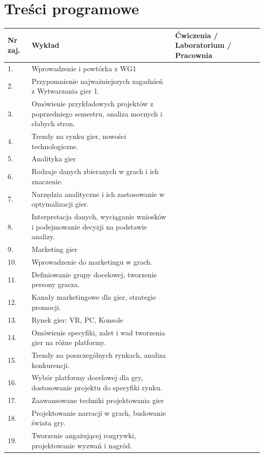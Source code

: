 \documentclass[12pt, a4paper]{article}
\begin{document}
\section{Treści programowe}

\begin{longtable}{|p{1.5cm}|p{6.5cm}|p{6.5cm}|}
\hline
\textbf{Nr zaj.} & \textbf{Wykład} & \textbf{Ćwiczenia / Laboratorium / Pracownia} \\\hline
\endhead
  \hline
  1. & Wprowadzenie i powtórka z WG1 &  \\
  \hline
  2. & Przypomnienie najważniejszych zagadnień z Wytwarzania gier 1. &  \\
  \hline
  3. & Omówienie przykładowych projektów z poprzedniego semestru, analiza mocnych i słabych stron. &  \\
  \hline
  4. & Trendy na rynku gier, nowości technologiczne. &  \\
  \hline
  5. & Analityka gier &  \\
  \hline
  6. & Rodzaje danych zbieranych w grach i ich znaczenie. &  \\
  \hline
  7. & Narzędzia analityczne i ich zastosowanie w optymalizacji gier. &  \\
  \hline
  8. & Interpretacja danych, wyciąganie wniosków i podejmowanie decyzji na podstawie analizy. &  \\
  \hline
  9. & Marketing gier &  \\
  \hline
  10. & Wprowadzenie do marketingu w grach. &  \\
  \hline
  11. & Definiowanie grupy docelowej, tworzenie persony gracza. &  \\
  \hline
  12. & Kanały marketingowe dla gier, strategie promocji. &  \\
  \hline
  13. & Rynek gier: VR, PC, Konsole &  \\
  \hline
  14. & Omówienie specyfiki, zalet i wad tworzenia gier na różne platformy. &  \\
  \hline
  15. & Trendy na poszczególnych rynkach, analiza konkurencji. &  \\
  \hline
  16. & Wybór platformy docelowej dla gry, dostosowanie projektu do specyfiki rynku. &  \\
  \hline
  17. & Zaawansowane techniki projektowania gier &  \\
  \hline
  18. & Projektowanie narracji w grach, budowanie świata gry. &  \\
  \hline
  19. & Tworzenie angażującej rozgrywki, projektowanie wyzwań i nagród. &  \\

\end{longtable}
\end{document}
